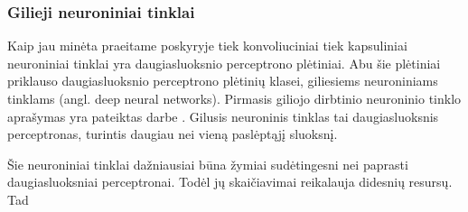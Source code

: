 \subsubsection{Gilieji neuroniniai tinklai}

Kaip jau minėta praeitame poskyryje tiek konvoliuciniai tiek kapsuliniai neuroniniai tinklai yra daugiasluoksnio perceptrono plėtiniai. Abu šie plėtiniai priklauso daugiasluoksnio perceptrono plėtinių klasei, giliesiems neuroniniams tinklams (angl. deep neural networks). Pirmasis giliojo dirbtinio neuroninio tinklo aprašymas yra pateiktas darbe \cite{deepNN}. Gilusis neuroninis tinklas tai daugiasluoksnis perceptronas, turintis daugiau nei vieną paslėptąjį sluoksnį.

Šie neuroniniai tinklai dažniausiai būna žymiai sudėtingesni nei paprasti daugiasluoksniai perceptronai. Todėl jų skaičiavimai reikalauja didesnių resursų. Tad 

